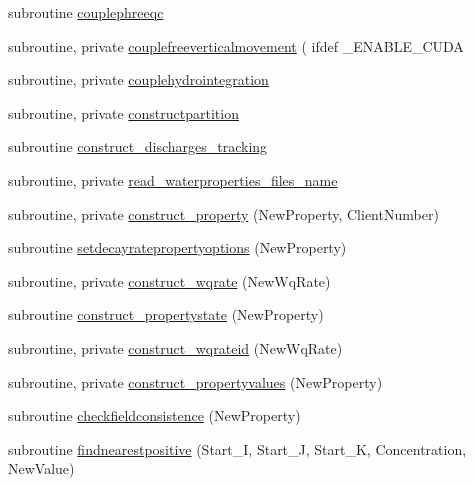 \begin{DoxyCompactItemize}
\item 
subroutine \mbox{\hyperlink{namespacemodulewaterproperties_a191c738815d3d3376105cfd51b26b59d}{couplephreeqc}}
\item 
subroutine, private \mbox{\hyperlink{namespacemodulewaterproperties_ab19037aba70755844475216443ec3a35}{couplefreeverticalmovement}} ( ifdef \+\_\+\+E\+N\+A\+B\+L\+E\+\_\+\+C\+U\+DA
\item 
subroutine, private \mbox{\hyperlink{namespacemodulewaterproperties_a52ab6cc6910ba77bfa6154aca1f67db0}{couplehydrointegration}}
\item 
subroutine, private \mbox{\hyperlink{namespacemodulewaterproperties_ac9b1f4e5840ee5c5f36ff7bee993386b}{constructpartition}}
\item 
subroutine \mbox{\hyperlink{namespacemodulewaterproperties_a30c3709afcaafdcec85f3efda5a73d03}{construct\+\_\+discharges\+\_\+tracking}}
\item 
subroutine, private \mbox{\hyperlink{namespacemodulewaterproperties_ae31629679bdc4c42e1d3884a2f046435}{read\+\_\+waterproperties\+\_\+files\+\_\+name}}
\item 
subroutine, private \mbox{\hyperlink{namespacemodulewaterproperties_a87d8b877e916e4ea3318d7d568732d12}{construct\+\_\+property}} (New\+Property, Client\+Number)
\item 
subroutine \mbox{\hyperlink{namespacemodulewaterproperties_a9b03fe6ccf9de1a1c29846e4a8104c87}{setdecayratepropertyoptions}} (New\+Property)
\item 
subroutine, private \mbox{\hyperlink{namespacemodulewaterproperties_a8f1edb788021e4c68656d11b8b90ea26}{construct\+\_\+wqrate}} (New\+Wq\+Rate)
\item 
subroutine \mbox{\hyperlink{namespacemodulewaterproperties_ae8c62a5189e434530eafcfe1fe66dae4}{construct\+\_\+propertystate}} (New\+Property)
\item 
subroutine, private \mbox{\hyperlink{namespacemodulewaterproperties_ab6c7c187dc0a1da19d043a98bcdde9ec}{construct\+\_\+wqrateid}} (New\+Wq\+Rate)
\item 
subroutine, private \mbox{\hyperlink{namespacemodulewaterproperties_aa646aa8763204437f6ad88ddbd01c560}{construct\+\_\+propertyvalues}} (New\+Property)
\item 
subroutine \mbox{\hyperlink{namespacemodulewaterproperties_ae1f665f653d3f72ef388bbb889ec57c9}{checkfieldconsistence}} (New\+Property)
\item 
subroutine \mbox{\hyperlink{namespacemodulewaterproperties_a9af27763ee733163a23f71ee92aafb09}{findnearestpositive}} (Start\+\_\+I, Start\+\_\+J, Start\+\_\+K, Concentration, New\+Value)

\end{DoxyCompactItemize}
